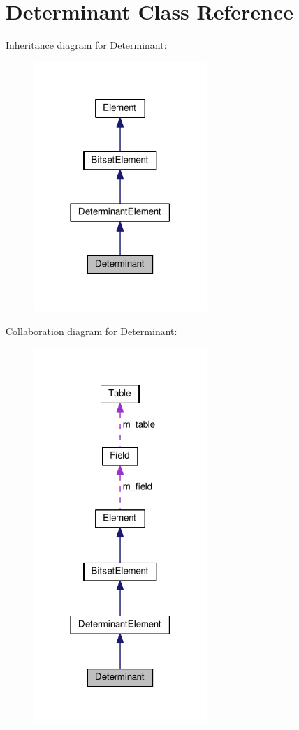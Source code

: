 \hypertarget{classDeterminant}{}\section{Determinant Class Reference}
\label{classDeterminant}


Inheritance diagram for Determinant\+:\nopagebreak
\begin{figure}[H]
\begin{center}
\leavevmode
\includegraphics[width=186pt]{classDeterminant__inherit__graph}
\end{center}
\end{figure}


Collaboration diagram for Determinant\+:\nopagebreak
\begin{figure}[H]
\begin{center}
\leavevmode
\includegraphics[width=186pt]{classDeterminant__coll__graph}
\end{center}
\end{figure}
